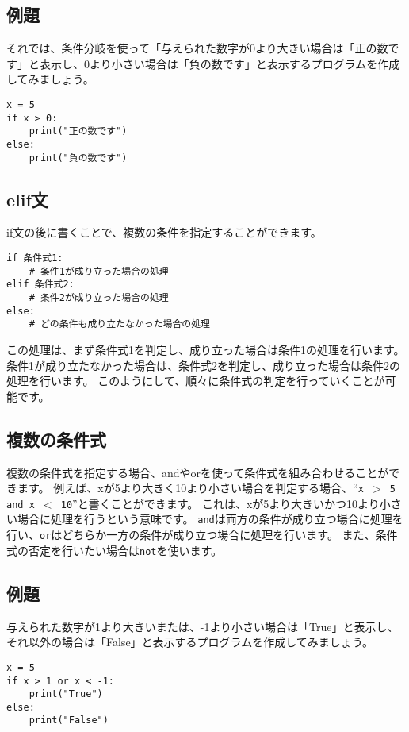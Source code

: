 \documentclass[a4paper,titlepage,dvipdfmx]{jarticle}
\begin{document}
\subsection*{例題}
それでは、条件分岐を使って「与えられた数字が0より大きい場合は「正の数です」と表示し、0より小さい場合は「負の数です」と表示するプログラムを作成してみましょう。
\begin{lstlisting}[caption=条件分岐の例,label=条件分岐の例]
x = 5
if x > 0:
    print("正の数です")
else:
    print("負の数です")
\end{lstlisting}

\subsection{elif文}
if文の後に書くことで、複数の条件を指定することができます。
\begin{lstlisting}[caption=elif文の基本構文]
if 条件式1:
    # 条件1が成り立った場合の処理
elif 条件式2:
    # 条件2が成り立った場合の処理
else:
    # どの条件も成り立たなかった場合の処理
\end{lstlisting}
この処理は、まず条件式1を判定し、成り立った場合は条件1の処理を行います。
条件1が成り立たなかった場合は、条件式2を判定し、成り立った場合は条件2の処理を行います。
このようにして、順々に条件式の判定を行っていくことが可能です。

\subsection{複数の条件式}
複数の条件式を指定する場合、andやorを使って条件式を組み合わせることができます。
例えば、xが5より大きく10より小さい場合を判定する場合、``\texttt{x $>$ 5 and x $<$ 10}''と書くことができます。
これは、xが5より大きいかつ10より小さい場合に処理を行うという意味です。
\texttt{and}は両方の条件が成り立つ場合に処理を行い、\texttt{or}はどちらか一方の条件が成り立つ場合に処理を行います。
また、条件式の否定を行いたい場合は\texttt{not}を使います。
\subsection*{例題}
与えられた数字が1より大きいまたは、-1より小さい場合は「True」と表示し、それ以外の場合は「False」と表示するプログラムを作成してみましょう。
\begin{lstlisting}[caption=複数の条件式の例,label=複数の条件式の例]
x = 5
if x > 1 or x < -1:
    print("True")
else:
    print("False")
\end{lstlisting}
\end{document}

